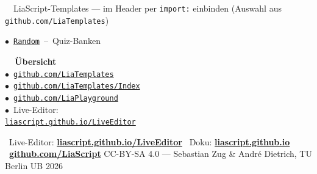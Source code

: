 \documentclass[a4paper,landscape,9pt]{extarticle}
\begin{document}
\begin{liainfo}{\faPuzzlePiece~~LiaScript-Templates — im Header per \texttt{import:} einbinden (Auswahl aus \texttt{github.com/LiaTemplates})}
\begin{minipage}[t]{0.24\linewidth}
$\bullet$~\href{https://github.com/LiaTemplates/Random}{\texttt{Random}}~–~Quiz-Banken
\end{minipage}\hfill
\begin{minipage}[t]{0.24\linewidth}
\textbf{\color{liagreen}\faGithub~~Übersicht}\\[1pt]
$\bullet$~\href{https://github.com/LiaTemplates}{\texttt{github.com/LiaTemplates}}\\
$\bullet$~\href{https://github.com/LiaTemplates/Index}{\texttt{github.com/LiaTemplates/Index}}\\
$\bullet$~\href{https://github.com/LiaPlayground}{\texttt{github.com/LiaPlayground}}\\
$\bullet$~Live-Editor:\\
\hspace*{0.6em}\href{https://liascript.github.io/LiveEditor/}{\texttt{liascript.github.io/LiveEditor}}
\end{minipage}
\end{liainfo}

\vspace{4pt}
{\sffamily\scriptsize\color{muted}
\faInfoCircle~Live-Editor: \href{https://liascript.github.io/LiveEditor/}{\textbf{liascript.github.io/LiveEditor}}\hfill
\faBook~Doku: \href{https://liascript.github.io}{\textbf{liascript.github.io}}\hfill
\faGithub~\href{https://github.com/LiaScript}{\textbf{github.com/LiaScript}} \quad
CC-BY-SA 4.0 — Sebastian Zug \& André Dietrich, TU Berlin UB 2026}
\end{document}
